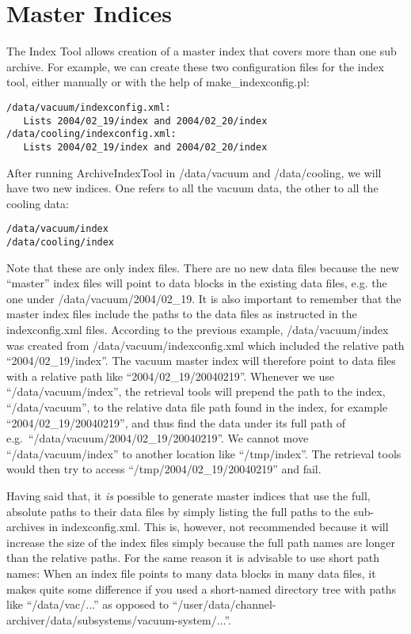 \section{Master Indices}
The Index Tool allows creation of a master index
that covers more than one sub archive. For example, we can create
these two configuration files for the index tool, either manually or
with the help of make\_indexconfig.pl:
\begin{lstlisting}[frame=none,keywordstyle=\sffamily]
/data/vacuum/indexconfig.xml:
   Lists 2004/02_19/index and 2004/02_20/index
/data/cooling/indexconfig.xml:
   Lists 2004/02_19/index and 2004/02_20/index
\end{lstlisting}

\noindent After running ArchiveIndexTool in /data/vacuum and /data/cooling,
we will have two new indices. One refers to all the vacuum data, the
other to all the cooling data:
\begin{lstlisting}[frame=none,keywordstyle=\sffamily]
/data/vacuum/index
/data/cooling/index
\end{lstlisting}
\noindent Note that these are only index files. There are no new data
files because the new ``master'' index files will point to data blocks
in the existing data files, e.g. the one under /data/vacuum/2004/02\_19. 
It is also important to remember that the master index files include the
paths to the data files as instructed in the indexconfig.xml files.
According to the previous example,  
/data/vacuum/index was created from
/data/vacuum/indexconfig.xml which included the relative path
``2004/02\_19/index''. The vacuum master index will therefore point to
data files with a relative path like ``2004/02\_19/20040219''.
Whenever we use ``/data/vacuum/index'', the retrieval tools will prepend
the path to the index, ``/data/vacuum'', to the relative data 
file path found in the index, for example ``2004/02\_19/20040219'', and thus
find the data under its full path of
 e.g.\ ``/data/vacuum/2004/02\_19/20040219''.
We cannot move ``/data/vacuum/index'' to another location like
``/tmp/index''. The retrieval tools would then try to access
``/tmp/2004/02\_19/20040219'' and fail.

Having said that, it \emph{is} possible to generate master indices
that use the full, absolute paths to their data files by simply listing
the full paths to the sub-archives in indexconfig.xml. This is,
however, not recommended because it will increase the size of the
index files simply because the full path names are longer than the
relative paths. For the same reason it is advisable to use short path
names: When an index file points to many data blocks in many data
files, it makes quite some difference if you used a short-named
directory tree with paths like ``/data/vac/...'' as opposed to
``/user/data/channel-archiver/data/subsystems/vacuum-system/...''.

